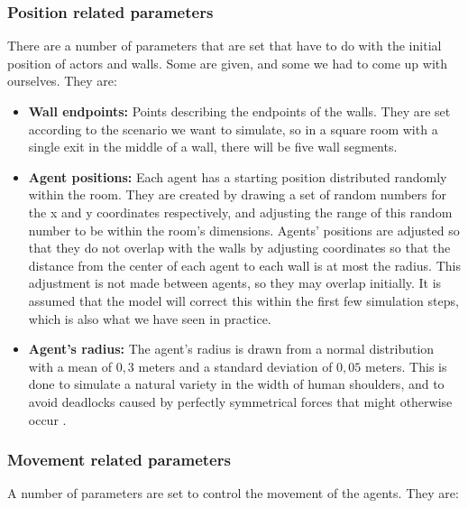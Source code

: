 \subsubsection{Position related parameters}
There are a number of parameters that are set that have to do with the initial 
position of actors and walls. Some are given, and some we had to come up
with ourselves. They are:

\begin{itemize}
    \item \textbf{Wall endpoints:} Points describing the endpoints of the 
        walls. They are set according to the scenario we want to simulate, so 
        in a square room with a single exit in the middle of a wall, there 
        will be five wall segments.

    \item \textbf{Agent positions:} Each agent has a starting position 
        distributed randomly within the room. They are created by drawing a 
        set of random numbers for the x and y coordinates respectively, and 
        adjusting the range of this random number to be within the room's 
        dimensions. Agents' positions are adjusted so that they do not overlap 
        with the walls by adjusting coordinates so that the distance from the 
        center of each agent to each wall is at most the radius. This 
        adjustment is not made between agents, so they may overlap initially. 
        It is assumed that the model will correct this within the first few 
        simulation steps, which is also what we have seen in practice.

    \item \textbf{Agent's radius:} The agent's radius is drawn from a normal 
        distribution with a mean of $0,3$ meters and a standard deviation of 
        $0,05$ meters. This is done to simulate a natural variety in the width 
        of human shoulders, and to avoid deadlocks caused by perfectly 
        symmetrical forces that might otherwise occur \cite{helbing00}.
\end{itemize}

\subsubsection{Movement related parameters}
A number of parameters are set to control the movement of the agents. They 
are:

